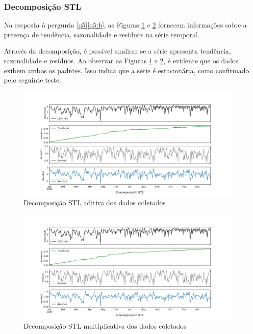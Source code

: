 \subsubsection{Decomposi\c c\~ao STL}\label{subsubsec:stl}



Na resposta à pergunta \ref{q5}\ref{q5:b}, as Figuras \ref{fig:stl-aditiva} e \ref{fig:stl} fornecem informações sobre a presença de tendência, sazonalidade e resíduos na série temporal.

Através da decomposição, é possível analisar se a série apresenta tendência, sazonalidade e resíduos. Ao observar as Figuras \ref{fig:stl-aditiva} e \ref{fig:stl}, é evidente que os dados exibem ambos os padrões. Isso indica que a série é estacionária, como confirmado pelo seguinte teste.

\begin{figure}[H]
	\centering
	\caption{Decomposição STL aditiva dos dados coletados}
	\label{fig:stl-aditiva}
	\includegraphics[width=0.9\linewidth]{"Resultados/Figuras/STL aditiva"}
	
	
\end{figure}

\begin{figure}[H]
	\centering
	\caption{Decomposição STL multiplicativa dos dados coletados}
	\label{fig:stl}
	\includegraphics[width=0.9\linewidth]{Resultados/Figuras/STL}
		
	
	
\end{figure}



